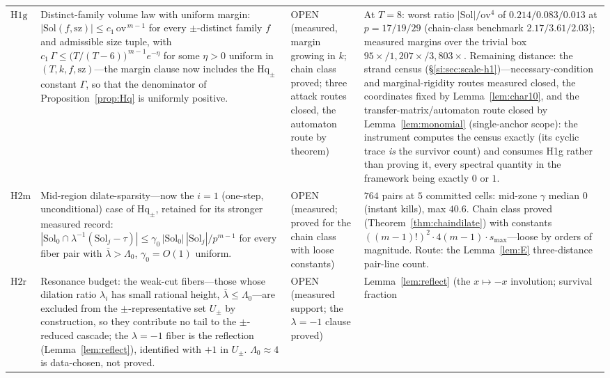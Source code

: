 {\begin{longtable}{@{}p{}p{}
                   p{}p{}@{}}
$\mathrm{H1g}$ &
Distinct-family volume law with uniform margin:
$|\mathrm{Sol}(f,\mathrm{sz})|\le c_1\,\mathrm{ov}^{\,m-1}$ for every
$\pm$-distinct family $f$ and admissible size tuple, with
$c_1\,\Gamma\le\bigl(T/(T-6)\bigr)^{\,m-1}e^{-\eta}$ for some $\eta>0$ uniform
in $(T,k,f,\mathrm{sz})$---the margin clause now includes the $\mathrm{Hq}_\pm$
constant $\Gamma$, so that the denominator of Proposition~\ref{prop:Hq} is
uniformly positive. &
OPEN (measured, margin growing in $k$; chain class proved; three
attack routes closed, the automaton route by theorem) &
At $T=8$: worst ratio $|\mathrm{Sol}|/\mathrm{ov}^4$ of
$0.214/0.083/0.013$ at $p=17/19/29$ (chain-class benchmark
$2.17/3.61/2.03$); measured margins over the trivial box
$95\times/1{,}207\times/3{,}803\times$. Remaining distance: the strand
census (\S\ref{si:sec:scale-h1})---necessary-condition and
marginal-rigidity routes measured closed, the coordinates fixed by
Lemma~\ref{lem:char10}, and the transfer-matrix/automaton route closed
by Lemma~\ref{lem:monomial} (single-anchor scope): the instrument computes
the census exactly (its cyclic trace \emph{is} the survivor count) and
consumes H1g rather than proving it, every spectral quantity in the
framework being exactly $0$ or $1$. \\
$\mathrm{H2m}$ &
Mid-region dilate-sparsity---now the $i=1$ (one-step, unconditional) case of
$\mathrm{Hq}_\pm$, retained for its stronger measured record:
$|\mathrm{Sol}_0\cap\lambda^{-1}(\mathrm{Sol}_j-\tau)|\le
\gamma_0\,|\mathrm{Sol}_0|\,|\mathrm{Sol}_j|/p^{m-1}$ for every fiber
pair with $\bar\lambda>\Lambda_0$, $\gamma_0=O(1)$ uniform. &
OPEN (measured; proved for the chain class with loose constants) &
$764$ pairs at $5$ committed cells: mid-zone $\gamma$ median $0$
(instant kills), max $40.6$. Chain class proved
(Theorem~\ref{thm:chaindilate}) with constants $((m-1)!)^2\cdot 4(m-1)\cdot
s_{\max}$---loose by orders of magnitude. Route: the
Lemma~\ref{lem:E} three-distance pair-line count. \\
$\mathrm{H2r}$ &
Resonance budget: the weak-cut fibers---those whose dilation ratio
$\lambda_i$ has small rational height, $\bar\lambda\le\Lambda_0$---are
excluded from the $\pm$-representative set $U_\pm$ by construction, so they
contribute no tail to the $\pm$-reduced cascade; the $\lambda=-1$ fiber is
the reflection (Lemma~\ref{lem:reflect}), identified with $+1$ in $U_\pm$.
$\Lambda_0\approx 4$ is data-chosen, not proved. &
OPEN (measured support; the $\lambda=-1$ clause proved) &
Lemma~\ref{lem:reflect} (the $x\mapsto-x$ involution; survival fraction

\end{longtable}}
